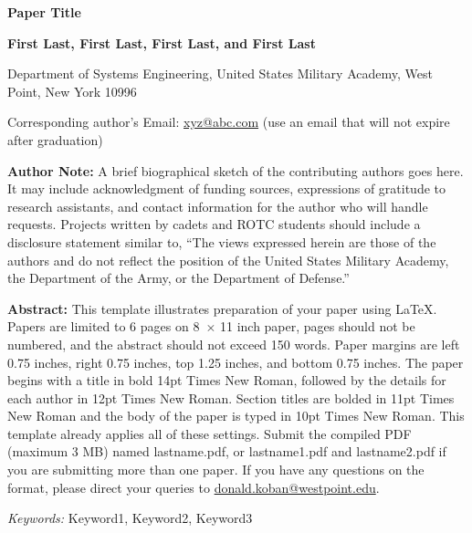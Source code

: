\documentclass[10pt,letterpaper]{article}
\newcommand{\frontblock}[2]{\noindent\textbf{#1:} #2\par\vspace{10pt}}
\begin{document}
\begin{center}
  {\fontsize{14}{17}\bfseries Paper Title\par}
  \vspace{10pt}

  {\fontsize{12}{14}\bfseries First Last, First Last, First Last, and First Last\par}
  \vspace{10pt}
  Department of Systems Engineering, United States Military Academy,
  West Point, New York 10996\par


  \vspace{10pt}
  Corresponding author's Email: \href{mailto:xyz@abc.com}{xyz@abc.com}
  (use an email that will not expire after graduation)
\end{center}
\vspace{10pt}

{\setlength{\parindent}{0pt}
\frontblock{Author Note}{A brief biographical sketch of the contributing authors goes here.
It may include acknowledgment of funding sources, expressions of gratitude to research
assistants, and contact information for the author who will handle requests. Projects
written by cadets and ROTC students should include a disclosure statement similar to,
``The views expressed herein are those of the authors and do not reflect the position of
the United States Military Academy, the Department of the Army, or the Department of
Defense.''}

\frontblock{Abstract}{This template illustrates preparation of your paper using \LaTeX.
Papers are limited to 6 pages on 8\,\textonehalf{} $\times$ 11 inch paper, pages should not
be numbered, and the abstract should not exceed 150 words. Paper margins are left
0.75 inches, right 0.75 inches, top 1.25 inches, and bottom 0.75 inches. The paper begins
with a title in bold 14pt Times New Roman, followed by the details for each author in
12pt Times New Roman. Section titles are bolded in 11pt Times New Roman and the body of the
paper is typed in 10pt Times New Roman. This template already applies all of these
settings. Submit the compiled PDF (maximum 3 MB) named lastname.pdf, or lastname1.pdf and
lastname2.pdf if you are submitting more than one paper. If you have any questions on the format, please direct your queries to
\href{mailto:donald.koban@westpoint.edu}{donald.koban@westpoint.edu}.}

\noindent\textit{Keywords:} Keyword1, Keyword2, Keyword3\par
}
\end{document}
